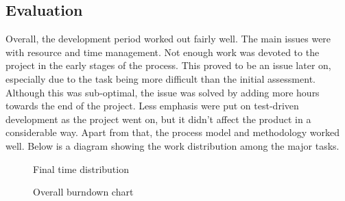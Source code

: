 \subsection{Evaluation}
\label{subsec:project_evaluation-development-evaluation}

Overall, the development period worked out fairly well. The main issues were with resource and time management. Not enough work was devoted to the project in the early stages of the process. This proved to be an issue later on, especially due to the task being more difficult than the initial assessment. Although this was sub-optimal, the issue was solved by adding more hours towards the end of the project. Less emphasis were put on test-driven development as the project went on, but it didn't affect the product in a considerable way. Apart from that, the process model and methodology worked well. Below is a diagram showing the work distribution among the major tasks.

\begin{center}
  \begin{figure}[ht!]
    \caption{Final time distribution}
    \label{fig:kake2}
  \end{figure}
\end{center}

\begin{center}
  \begin{figure}[ht!]
    \caption{Overall burndown chart}
    \label{fig:release-burndown}
  \end{figure}
\end{center}

